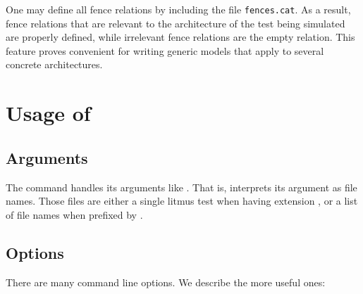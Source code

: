 One may define all fence relations by including the file
\texttt{fences.cat}. As a result, fence relations that are
relevant to the architecture of the test being simulated  are properly defined,
while irrelevant fence relations are the empty relation.
This feature proves convenient for writing generic models that apply
to several concrete architectures.
\egroup



\section{Usage of \herd}

\subsection{Arguments}
The command \herd{} handles its arguments like \litmus.
That is, \herd{} interprets its argument as file names.
Those files are either a single litmus test
when having extension , or a list of file names
when prefixed by .


\subsection{Options}
There are many command line options.
We describe the more useful ones:


